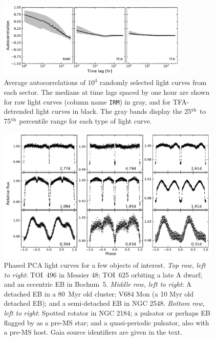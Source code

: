\documentclass[12pt,twocolumn,tighten]{aastex62}
\begin{document}
\begin{figure}[!t]
	\begin{center}
		\leavevmode
		\includegraphics[width=0.85\textwidth]{avg_acf.pdf}
	\end{center}
	\vspace{-0.7cm}
  \caption{
    Average autocorrelations of $10^4$ randomly selected light curves
    from each sector.  The medians at time lags spaced by one hour are
    shown for raw light curves (column name \texttt{IRM}) in gray, and
    for TFA-detrended light curves in black.  The gray bands display
    the 25$^{\rm th}$ to 75$^{\rm th}$ percentile range for each type
    of light curve.
  \label{fig:avg_acf}
	}
\end{figure}

\begin{figure}[!t]
	\begin{center}
		\leavevmode
		\includegraphics[width=1\textwidth]{quilt_s6_s7.pdf}
	\end{center}
	\vspace{-0.8cm}
	\caption{
		Phased PCA light curves for a few objects of interest.
		{\it Top row, left to right}:
		TOI~496 in Messier 48;
		TOI~625 orbiting a late A dwarf;
		and an eccentric EB in Bochum~5.
		{\it Middle row, left to right}:
		A detached EB in a 80~Myr old cluster;
		V684 Mon (a 10 Myr old detached EB);
		and a semi-detached EB in NGC 2548.
		{\it Bottom row, left to right}:
		Spotted rotator in NGC 2184;
		a pulsator or perhaps EB flagged by \citet{zari_3d_2018} as a pre-MS 
		star;
		and a quasi-periodic pulsator, also with a pre-MS host.
		Gaia source identifiers are given in the text.
	\label{fig:quilt}
	}
\end{figure}
\end{document}
